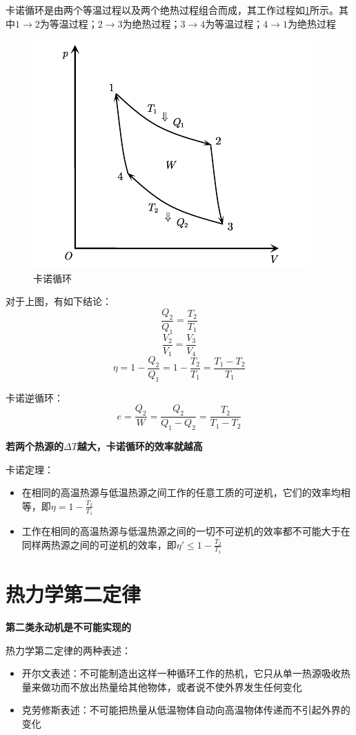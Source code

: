 \documentclass[12pt, a4paper, twoside]{ctexbook}
\begin{document}
卡诺循环是由两个等温过程以及两个绝热过程组合而成，其工作过程如\textcolor{blue}{\cref{fig:卡诺循环}}所示。其中$1\to2$为等温过程；$2\to3$为绝热过程；$3\to4$为等温过程；$4\to1$为绝热过程
\begin{figure}[H]
    \centerline{\includegraphics[scale=1.2]{卡诺循环.pdf}}
    \caption{卡诺循环}\label{fig:卡诺循环}
\end{figure}
对于上图，有如下结论：
$$
\frac{Q_2}{Q_1}=\frac{T_2}{T_1}
$$
$$
\frac{V_2}{V_1}=\frac{V_3}{V_4}
$$
$$
\eta=1-\frac{Q_2}{Q_1}=1-\frac{T_2}{T_1}=\frac{T_1-T_2}{T_1}
$$

{\sonti 卡诺逆循环}：
$$
e=\frac{Q_2}{W}=\frac{Q_2}{Q_1-Q_2}=\frac{T_2}{T_1-T_2}
$$

\textbf{若两个热源的$\Delta T$越大，卡诺循环的效率就越高}

{\sonti 卡诺定理}：
\begin{itemize}
    \item 在相同的高温热源与低温热源之间工作的任意工质的可逆机，它们的效率均相等，即$\eta=1-\frac{T_2}{T_1}$
    \item 工作在相同的高温热源与低温热源之间的一切不可逆机的效率都不可能大于在同样两热源之间的可逆机的效率，即$\eta'\leqslant 1-\frac{T_2}{T_1}$
\end{itemize}
\section{热力学第二定律}
\textbf{第二类永动机是不可能实现的}

{\sonti 热力学第二定律的两种表述}：
\begin{itemize}
    \item {\sonti 开尔文表述}：不可能制造出这样一种循环工作的热机，它只从单一热源吸收热量来做功而不放出热量给其他物体，或者说不使外界发生任何变化
    \item {\sonti 克劳修斯表述}：不可能把热量从低温物体自动向高温物体传递而不引起外界的变化
\end{itemize}
\end{document}
